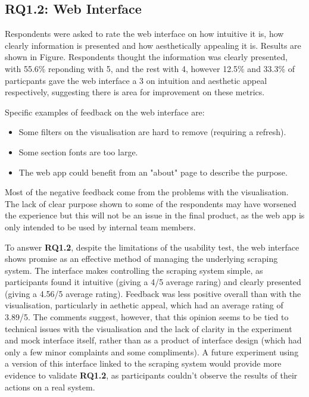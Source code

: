 \documentclass{l4proj}
\begin{document}
\subsection{RQ1.2: Web Interface}
Respondents were asked to rate the web interface on how intuitive it is, how clearly information is presented and how aesthetically appealing it is. Results are shown in Figure. Respondents thought the information was clearly presented, with 55.6\% reponding with 5, and the rest with 4, however 12.5\% and 33.3\% of particpants gave the web interface a 3 on intuition and aesthetic appeal respectively, suggesting there is area for improvement on these metrics. 

Specific examples of feedback on the web interface are:
\begin{itemize}
    \item Some filters on the visualisation are hard to remove (requiring a refresh).
    \item Some section fonts are too large.
    \item The web app could benefit from an "about" page to describe the purpose.
\end{itemize}

Most of the negative feedback come from the problems with the visualisation. The lack of clear purpose shown to some of the respondents may have worsened the experience but this will not be an issue in the final product, as the web app is only intended to be used by internal team members. \par 
To answer \textbf{RQ1.2}, despite the limitations of the usability test, the web interface shows promise as an effective method of managing the underlying scraping system. The interface makes controlling the scraping system simple, as participants found it intuitive (giving a 4/5 average raring) and clearly presented (giving a 4.56/5 average rating). Feedback was less positive overall than with the visualisation, particularly in aethetic appeal, which had an average rating of 3.89/5. The comments suggest, however, that this opinion seems to be tied to technical issues with the visualisation and the lack of clarity in the experiment and mock interface itself, rather than as a product of interface design (which had only a few minor complaints and some compliments). A future experiment using a version of this interface linked to the scraping system would provide more evidence to validate \textbf{RQ1.2}, as participants couldn't observe the results of their actions on a real system.
\end{document}
